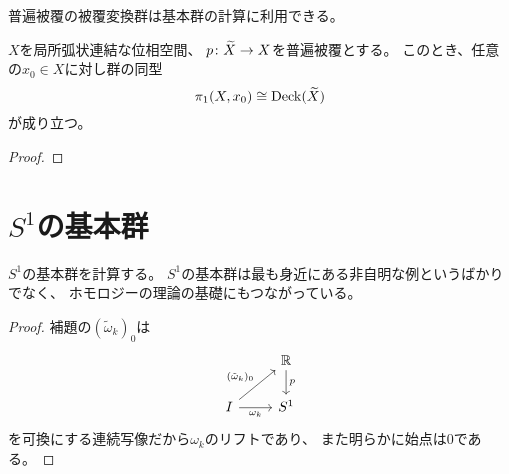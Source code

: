\documentclass[report]{jlreq}
\begin{document}
普遍被覆の被覆変換群は基本群の計算に利用できる。

\begin{theorem}[普遍被覆の被覆変換群と基本群]
    $X$を局所弧状連結な位相空間、
    $p \colon \widetilde{X} \to X$を普遍被覆とする。
    このとき、任意の$x_0 \in X$に対し群の同型
    \begin{equation}
        \pi_1(X, x_0) \cong \operatorname{Deck}(\widetilde{X})
    \end{equation}
    が成り立つ。
\end{theorem}

\begin{proof}
    \TODO{}
\end{proof}


%
\section{
    \texorpdfstring{%
        $S^1$の基本群%
    }{%
        S1の基本群%
    }%
}

$S^1$の基本群を計算する。
$S^1$の基本群は最も身近にある非自明な例というばかりでなく、
ホモロジーの理論の基礎にもつながっている。


\begin{proof}
    補題の$(\tilde{\omega}_k)_0$は
    \begin{equation}
        \begin{tikzcd}
            & \R \ar[d, "{p}"] \\
            I \ar[ur, "{(\tilde{\omega}_k)_0}"] \ar[r, "{\omega_k}"'] & S^1
        \end{tikzcd}
    \end{equation}
    を可換にする連続写像だから$\omega_k$のリフトであり、
    また明らかに始点は$0$である。
\end{proof}
\end{document}
